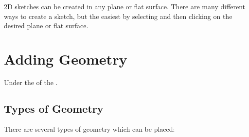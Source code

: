 2D sketches can be created in any plane or flat surface. There are many different ways to create a sketch, but the easiest by selecting  and then clicking on the desired plane or flat surface.
\section{Adding Geometry}

\begin{where-to-find}
    Under the  of the .
    \end{where-to-find}
    
\subsection{Types of Geometry}

There are several types of geometry which can be placed:

